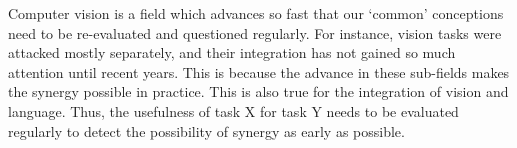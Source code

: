 Computer vision is a field which advances so fast  that our `common' conceptions need to be re-evaluated and questioned regularly.  For instance, vision tasks were attacked mostly separately, and their integration has not gained so much attention until recent years.  This is because the advance in these sub-fields makes the synergy possible in practice.  This is also true for the integration of vision and language. Thus, the usefulness of task X for task Y needs to be evaluated regularly to detect the possibility of synergy as early as possible. 
